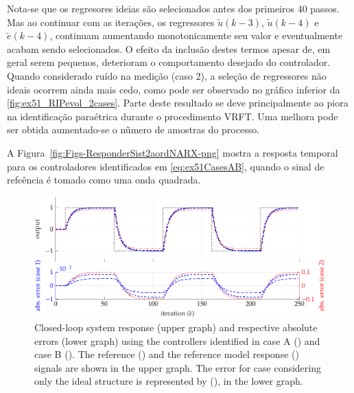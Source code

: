 \begin{exmp}
Nota-se que os regresores ideias são selecionados antes dos primeiros 40 passos.
Mas ao continuar com as iterações, os regressores $\tilde{u}(k-3)$, $\tilde{u}(k-4)$ e $\tilde{e}(k-4)$, continuam aumentando monotonicamente seu valor e eventualmente acabam sendo selecionados.
O efeito da inclusão destes termos apesar de, em geral serem pequenos, deterioram o comportamento desejado do controlador.
Quando considerado ruído na medição (caso 2), a seleção de regressores não ideais ocorrem ainda mais cedo, como pode ser observado no gráfico inferior da \ref{fig:ex51_RIPevol_2cases}.
Parte deste resultado se deve principalmente ao piora na identificação paraétrica durante o procedimento VRFT.
Uma melhora pode ser obtida aumentado-se o nũmero de amostras do processo.

A Figura~\ref{fig:Figs-ResponderSist2aordNARX-png} mostra a resposta temporal para os controladores identificados em \eqref{eq:ex51CasesAB}, quando o sinal de refeência é tomado como uma onda quadrada.


\begin{figure}[H]
       
  \centering
  \includegraphics[width=1\textwidth]{./Figs/Cap5/ex51_resp_temporal_mf2.tex.pdf}
  \caption{Closed-loop system response (upper graph) and respective absolute errors (lower graph) using the controllers identified in case A () and case B (). The reference () and the reference model response ()  signals are shown in the upper graph. The error for case considering only the ideal structure is represented by (), in the lower graph.}
  \label{fig:Figs-RespostaSist2aordNARX-png}
\end{figure}


\end{exmp}
